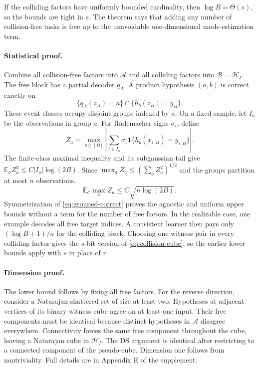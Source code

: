 \documentclass[twoside]{article}
\newcommand{\E}{\mathbb E}
\begin{document}
If the colliding factors have uniformly bounded cardinality, then $\log B=\Theta(s)$, so the bounds are tight in $s$. The theorem says that adding any number of collision-free tasks is free up to the unavoidable one-dimensional mode-estimation term.

\paragraph{Statistical proof.} Combine all collision-free factors into $\mathcal A$ and all colliding factors into $\mathcal B=\mathcal H_I$. The free block has a partial decoder $q_A$. A product hypothesis $(a,b)$ is correct exactly on
\begin{equation}
 \{q_A(z_A)=a\}\cap\{h_b(z_B)=y_B\}.
 \label{eq:grouped-correct}
\end{equation}
These event classes occupy disjoint groups indexed by $a$. On a fixed sample, let $I_a$ be the observations in group $a$. For Rademacher signs $\sigma_i$, define
\[
 Z_a=\max_{b\in[B]}
 \left|\sum_{i\in I_a}\sigma_i
 \mathbf1\{h_b(x_{i,B})=y_{i,B}\}\right|.
\]
The finite-class maximal inequality and its subgaussian tail give $\E_\sigma Z_a^2\leq C|I_a|\log(2B)$. Since $\max_aZ_a\leq(\sum_aZ_a^2)^{1/2}$ and the groups partition at most $n$ observations,
\[
 \E_\sigma\max_a Z_a\leq C\sqrt{n\log(2B)}.
\]
Symmetrization of \eqref{eq:grouped-correct} proves the agnostic and uniform upper bounds without a term for the number of free factors. In the realizable case, one example decodes all free target indices. A consistent learner then pays only $(\log B+1)/n$ for the colliding block. Choosing one witness pair in every colliding factor gives the $s$-bit version of \eqref{eq:collision-cube}, so the earlier lower bounds apply with $s$ in place of $r$.

\paragraph{Dimension proof.} The lower bound follows by fixing all free factors. For the reverse direction, consider a Natarajan-shattered set of size at least two. Hypotheses at adjacent vertices of its binary witness cube agree on at least one input. Their free components must be identical because distinct hypotheses in $\mathcal A$ disagree everywhere. Connectivity forces the same free component throughout the cube, leaving a Natarajan cube in $\mathcal H_I$. The DS argument is identical after restricting to a connected component of the pseudo-cube. Dimension one follows from nontriviality. Full details are in Appendix E of the supplement.
\end{document}

